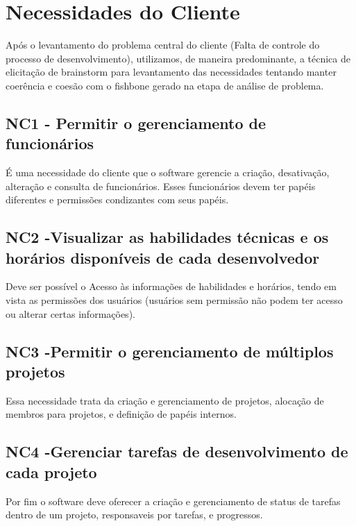 \section{Necessidades do Cliente}
\label{sec:nc}

Após o levantamento do problema central do cliente (Falta de controle do processo de desenvolvimento), utilizamos, de maneira predominante, a técnica de elicitação de brainstorm para levantamento das necessidades tentando manter coerência e coesão com o fishbone gerado na etapa de análise de problema.

\subsection{NC1 - Permitir o gerenciamento de funcionários}

É uma necessidade do cliente que o software gerencie a criação, desativação, alteração e consulta de funcionários. Esses funcionários devem ter papéis diferentes e permissões condizantes com seus papéis.
\subsection{NC2 -Visualizar as habilidades técnicas e os horários disponíveis de cada desenvolvedor}

Deve ser possível o Acesso às informações de habilidades e horários, tendo em vista as permissões dos usuários (usuários sem permissão não podem ter acesso ou alterar certas informações).

\subsection{NC3 -Permitir o gerenciamento de múltiplos projetos}

Essa necessidade trata da criação e gerenciamento de projetos, alocação de membros para projetos, e definição de papéis internos.

\subsection{NC4 -Gerenciar tarefas de desenvolvimento de cada projeto}

Por fim o software deve oferecer a criação e gerenciamento de status de tarefas dentro de um projeto, responsaveis por tarefas, e progressos.

